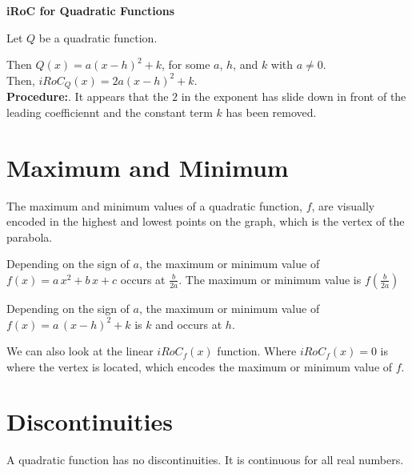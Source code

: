 \documentclass{ximera}
\begin{document}
\begin{procedure} \textbf{\textcolor{blue!75!black}{iRoC for Quadratic Functions}} 



Let $Q$ be a quadratic function.

Then $Q(x) = a (x - h)^2 + k$, for some $a$, $h$, and $k$ with $a \ne 0$. \\

Then, $iRoC_Q(x) = 2 a (x - h)^2 + k$. \\


\textbf{Procedure:}. It appears that the $2$ in the exponent has slide down in front of the leading coefficiennt and the constant term $k$ has been removed.



\end{procedure}












\section{Maximum and Minimum}


The maximum and minimum values of a quadratic function, $f$, are visually encoded in the highest and lowest points on the  graph, which is the vertex of the parabola.

Depending on the sign of $a$, the maximum or minimum value of $f(x) = a \, x^2 + b \, x + c$ occurs at $\frac{b}{2a}$. The maximum or minimum value is $f\left( \frac{b}{2a} \right)$


Depending on the sign of $a$, the maximum or minimum value of $f(x) = a \, (x - h)^2 + k$ is $k$ and occurs at $h$. 







We can also look at the linear $iRoC_f(x)$ function.  Where $iRoC_f(x) = 0$ is where the vertex is located, which encodes the maximum or minimum value of $f$.




\section{Discontinuities}


A quadratic function has no discontinuities.  It is continuous for all real numbers.
\end{document}
